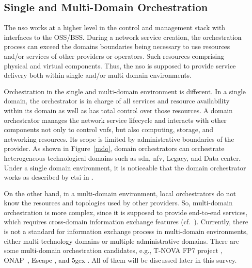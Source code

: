 

\subsection{Single and Multi-Domain Orchestration}
\label{sec:domain}

The \gls{nso} works at a higher level in the control and management stack with interfaces to the OSS/BSS. During a network service creation, the orchestration process can exceed the domains boundaries being necessary to use resources and/or services of other providers or operators. Such resources comprising physical and virtual components. Thus, the \gls{nso} is supposed to provide service delivery both within single and/or multi-domain environments.

Orchestration in the single and multi-domain environment is different. In a single domain, the orchestrator is in charge of all services and resource availability within its domain as well as has total control over those resources. A domain orchestrator manages the network service lifecycle and interacts with other components not only to control \glspl{vnf}, but also computing, storage, and networking resources. Its scope is limited by administrative boundaries of the provider. As shown in Figure~\ref{mdo}, domain orchestrators can orchestrate heterogeneous technological domains such as \gls{sdn}, \gls{nfv}, Legacy, and Data center. Under a single domain environment, it is noticeable that the domain orchestrator works as described by \gls{etsi} in \cite{ETSIIndustrySpecificationGroupISGNFV2014NetworkOptions}. 

On the other hand, in a multi-domain environment,  local orchestrators do not know the resources and topologies used by other providers. So, multi-domain orchestration is more complex, since it is supposed to provide end-to-end services, which requires cross-domain information exchange features (cf.~\cite{md2}). %
Currently, there is not a standard for information exchange process in multi-domain environments, either multi-technology domains or multiple administrative domains. There are some multi-domain orchestration candidates, e.g., T-NOVA FP7 project \cite{FP7projectT-NOVAT-NOVAInfrastructures}, ONAP~\cite{onap}, Escape \cite{Sonkoly2015Multi-DomainClouds}, and \gls{5gex} \cite{Bernardos20155GInfrastructures}. All of them will be discussed later in this survey.

